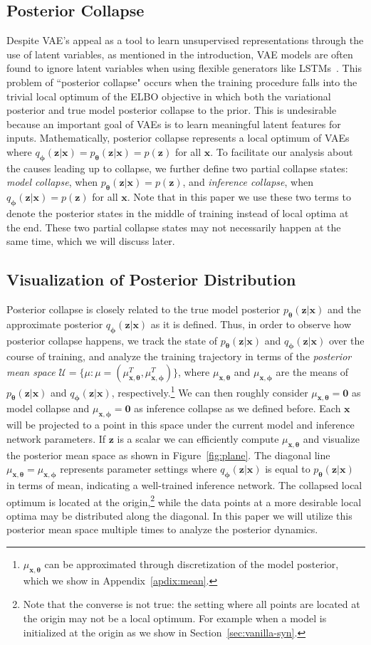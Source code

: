 \documentclass{article} \usepackage{iclr2019_conference,times}
\def\rvx{{\mathbf{x}}}
\def\rvz{{\mathbf{z}}}
\def\vtheta{{\bm{\theta}}}
\def\vphi{{\bm{\phi}}}
\newcommand{\qzx}{q_{\vphi}(\rvz|\rvx)}
\newcommand{\pzx}{p_{\vtheta}(\rvz|\rvx)}
\newcommand{\pz}{p(\rvz)}
\newcommand{\z}{\rvz}
\newcommand{\x}{\rvx}
\newcommand{\mut}{\mu_{\x, \vtheta}}
\newcommand{\mup}{\mu_{\x, \vphi}}
\begin{document}
\subsection{Posterior Collapse}
Despite VAE's appeal as a tool to learn unsupervised representations through the use of latent variables, as mentioned in the introduction, VAE models are often found to ignore latent variables when using flexible generators like LSTMs~\citep{bowman2015generating}. This problem of ``posterior collapse" occurs when the training procedure falls into the trivial local optimum of the ELBO objective in which both the variational posterior and true model posterior collapse to the prior. This is undesirable because an important goal of VAEs is to learn meaningful latent features for inputs. Mathematically, posterior collapse represents a local optimum of VAEs where $\qzx = \pzx = \pz$ for all $\x$. To facilitate our analysis about the causes leading up to collapse, we further define two partial collapse states: \textit{model collapse}, when $\pzx = \pz$, and \textit{inference collapse}, when $\qzx = \pz$ for all $\x$. Note that in this paper we use these two terms to denote the posterior states in the middle of training instead of local optima at the end. These two partial collapse states may not necessarily happen at the same time, which we will discuss later.




\subsection{Visualization of Posterior Distribution}
Posterior collapse is closely related to the true model posterior $\pzx$ and the approximate posterior $\qzx$ as it is defined. Thus, in order to observe how posterior collapse happens, we track the state of $\pzx$ and $\qzx$ over the course of training, and analyze the training trajectory in terms of the \textit{posterior mean space} $\mathcal{U} = \{\mu: \mu=(\mut^T, \mup^T)\}$, where $\mut$ and $\mup$ are the means of $\pzx$ and $\qzx$, respectively.\footnote{$\mut$ can be approximated through discretization of the model posterior, which we show in Appendix~\ref{apdix:mean}.} We can then roughly consider $\mut = \bm{0}$ as model collapse and $\mup = \bm{0}$ as inference collapse as we defined before. Each $\x$ will be projected to a point in this space under the current model and inference network parameters. If $\z$ is a scalar we can efficiently compute $\mut$ and visualize the posterior mean space as shown in Figure~\ref{fig:plane}. The diagonal line $\mut = \mup$ represents parameter settings where $\qzx$ is equal to $\pzx$ in terms of mean, indicating a well-trained inference network. The collapsed local optimum is located at the origin,\footnote{Note that the converse is not true: the setting where all points are located at the origin may not be a local optimum. For example when a model is initialized at the origin as we show in Section~\ref{sec:vanilla-syn}.} while the data points at a more desirable local optima may be distributed along the diagonal. In this paper we will utilize this posterior mean space multiple times to analyze the posterior dynamics.
\end{document}
